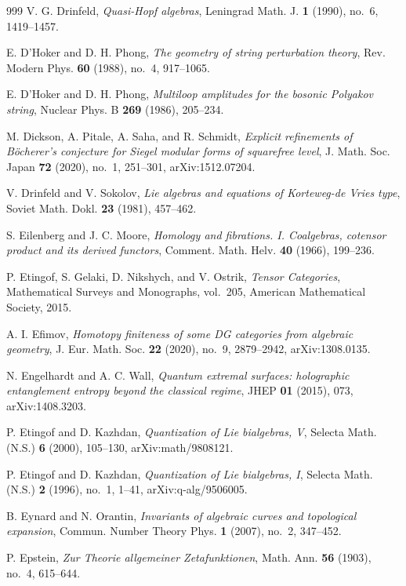 \begin{thebibliography}{999}
V. G. Drinfeld, \emph{Quasi-Hopf algebras}, Leningrad Math. J. \textbf{1} (1990), no.~6, 1419--1457.

E. D'Hoker and D. H. Phong, \emph{The geometry of string perturbation theory}, Rev. Modern Phys. \textbf{60} (1988), no.~4, 917--1065.

E. D'Hoker and D. H. Phong, \emph{Multiloop amplitudes for the bosonic Polyakov string}, Nuclear Phys. B \textbf{269} (1986), 205--234.

M. Dickson, A. Pitale, A. Saha, and R. Schmidt, \emph{Explicit refinements of B\"ocherer's conjecture for Siegel modular forms of squarefree level}, J. Math. Soc. Japan \textbf{72} (2020), no.~1, 251--301, arXiv:1512.07204.

V. Drinfeld and V. Sokolov, \emph{Lie algebras and equations of Korteweg-de Vries type}, Soviet Math. Dokl. \textbf{23} (1981), 457--462.

S. Eilenberg and J. C. Moore, \emph{Homology and fibrations. I. Coalgebras, cotensor product and its derived functors}, Comment. Math. Helv. \textbf{40} (1966), 199--236.

P. Etingof, S. Gelaki, D. Nikshych, and V. Ostrik, \emph{Tensor Categories}, Mathematical Surveys and Monographs, vol.~205, American Mathematical Society, 2015.

A. I. Efimov, \emph{Homotopy finiteness of some DG categories from algebraic geometry}, J. Eur. Math. Soc. \textbf{22} (2020), no.~9, 2879--2942, arXiv:1308.0135.

N. Engelhardt and A. C. Wall, \emph{Quantum extremal surfaces: holographic entanglement entropy beyond the classical regime}, JHEP \textbf{01} (2015), 073, arXiv:1408.3203.

P. Etingof and D. Kazhdan, \emph{Quantization of Lie bialgebras, V}, Selecta Math. (N.S.) \textbf{6} (2000), 105--130, arXiv:math/9808121.

P. Etingof and D. Kazhdan, \emph{Quantization of Lie bialgebras, I}, Selecta Math. (N.S.) \textbf{2} (1996), no.~1, 1--41, arXiv:q-alg/9506005.

B. Eynard and N. Orantin, \emph{Invariants of algebraic curves and topological expansion}, Commun. Number Theory Phys. \textbf{1} (2007), no.~2, 347--452.

P. Epstein, \emph{Zur Theorie allgemeiner Zetafunktionen}, Math. Ann. \textbf{56} (1903), no.~4, 615--644.


\end{thebibliography}
